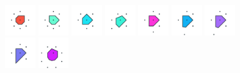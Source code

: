 \documentclass[text.tex]{subfiles}
\begin{document}
\begin{figure}[h!]
\includegraphics[width=0.12\textwidth]{img/results/circle8/circle8_122503_(2273_-941alpha_1)_005.pdf}
\includegraphics[width=0.12\textwidth]{img/results/circle8/circle8_122503_(2273_-941alpha_1)_006.pdf}
\includegraphics[width=0.12\textwidth]{img/results/circle8/circle8_122503_(2273_-941alpha_1)_007.pdf}
\includegraphics[width=0.12\textwidth]{img/results/circle8/circle8_122503_(2273_-941alpha_1)_008.pdf}
\includegraphics[width=0.12\textwidth]{img/results/circle8/circle8_122503_(2273_-941alpha_1)_009.pdf}
\includegraphics[width=0.12\textwidth]{img/results/circle8/circle8_122503_(2273_-941alpha_1)_010.pdf}
\includegraphics[width=0.12\textwidth]{img/results/circle8/circle8_122503_(2273_-941alpha_1)_011.pdf}
\includegraphics[width=0.12\textwidth]{img/results/circle8/circle8_122503_(2273_-941alpha_1)_012.pdf}
\includegraphics[width=0.12\textwidth]{img/results/circle8/circle8_122503_(2273_-941alpha_1)_013.pdf}
\end{figure}
\end{document}
